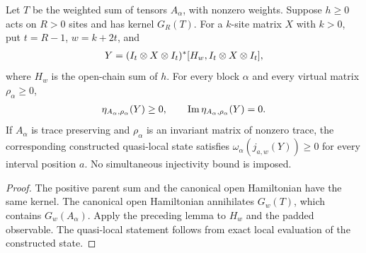 \begin{lemma}
    \label{thm:sector_commutator_patch_positive}
    \leanok
    Let $T$ be the weighted sum of tensors $A_\alpha$, with nonzero weights.
    Suppose $h\geq0$ acts on $R>0$ sites and has kernel $G_R(T)$. For a $k$-site
    matrix $X$ with $k>0$, put $t=R-1$, $w=k+2t$, and
    \begin{align}
        Y=(I_t\otimes X\otimes I_t)^*
        [H_w,I_t\otimes X\otimes I_t],
        \notag
    \end{align}
    where $H_w$ is the open-chain sum of $h$. For every block $\alpha$ and every
    virtual matrix $\rho_\alpha\geq0$,
    \begin{align}
        \eta_{A_\alpha,\rho_\alpha}(Y)\geq0,
        \qquad \operatorname{Im}\eta_{A_\alpha,\rho_\alpha}(Y)=0.
        \notag
    \end{align}
    If $A_\alpha$ is trace preserving and $\rho_\alpha$ is an invariant matrix
    of nonzero trace, the corresponding constructed quasi-local state satisfies
    $\omega_\alpha(j_{a,w}(Y))\geq0$ for every interval position $a$.
    No simultaneous injectivity bound is imposed.
\end{lemma}
\begin{proof}\leanok
    The positive parent sum and the canonical open Hamiltonian have the same
    kernel. The canonical open Hamiltonian annihilates $G_w(T)$, which contains
    $G_w(A_\alpha)$. Apply the preceding lemma to $H_w$ and the padded observable.
    The quasi-local statement follows from exact local evaluation of the
    constructed state.
\end{proof}

